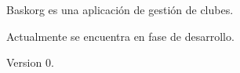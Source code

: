 Baskorg es una aplicación de gestión de clubes.

Actualmente se encuentra en fase de desarrollo.

\begin{DoxyVersion}{Version}
0. 
\end{DoxyVersion}
